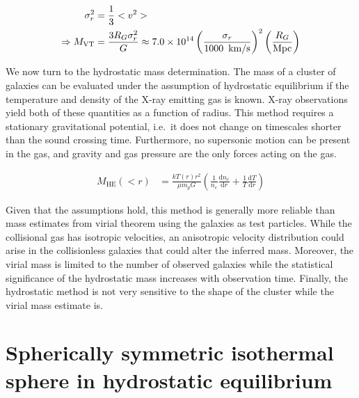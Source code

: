\documentclass[MScProj_TLRH_ClusterEnergy.tex]{subfiles}
\begin{document}
\begin{align}
    \sigma_r^2 &= \frac{1}{3} <v^2> \\
    \Rightarrow M_{\text{VT}} &= \frac{3 R_{G} \sigma_r^2}{G} 
    \approx 7.0 \times 10^{14} \left(\frac{\sigma_r}{1000 \text{\, km/s}} \right)^2 
    \left(\frac{R_{G}}{\text{Mpc}}\right) \label{eq:mvirialtheorem}
\end{align}

We now turn to the hydrostatic mass determination. The mass of a cluster of
galaxies can be evaluated under the assumption of hydrostatic equilibrium if 
the temperature and density of the X-ray emitting gas is known. X-ray observations 
yield both of these quantities as a function of radius. This method requires a 
stationary gravitational potential, i.e.\ it does not change on timescales shorter 
than the sound crossing time. Furthermore, no supersonic motion can be present
in the gas, and gravity and gas pressure are the only forces acting on the gas.


\begin{align}
    M_{\text{HE}} (<r) &= \frac{kT(r)r^2}{\mu m_p G}
    \left( \frac{1}{n_e} \frac{\mathrm{d}n_e}{\mathrm{d}r} + \frac{1}{T} \frac{\mathrm{d}T}{\mathrm{d}r} \right)
        \label{eq:hydrostaticmass}
\end{align}


Given that the assumptions hold, this method is generally more reliable than mass
estimates from virial theorem using the galaxies as test particles. While the
collisional gas has isotropic velocities, an anisotropic velocity distribution
could arise in the collisionless galaxies that could alter the inferred mass.
Moreover, the virial mass is limited to the number of observed galaxies while
the statistical significance of the hydrostatic mass increases with observation
time. Finally, the hydrostatic method is not very sensitive to the shape of the 
cluster while the virial mass estimate is.






\section*{Spherically symmetric isothermal sphere in hydrostatic equilibrium}
\end{document}
